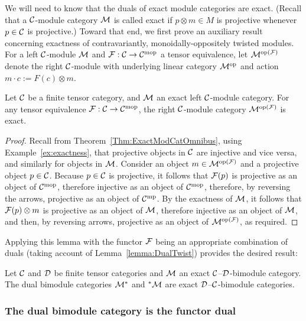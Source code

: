 \documentclass{amsart}
\begin{document}
We will need to know that the duals of exact module categories are exact.  (Recall that a $\mathcal C$-module category $\mathcal M$ is called exact if $p \otimes m \in M$ is projective whenever $p \in \mathcal C$ is projective.)  Toward that end, we first prove an auxiliary result concerning exactness of contravariantly, monoidally-oppositely twisted modules.  For a left $\mathcal C$-module $\mathcal M$ and $\mathcal F: \mathcal C \rightarrow \mathcal C^{\mathrm{mop}}$ a tensor equivalence, let $\mathcal M^{\mathrm{op}(\mathcal F)}$ denote the right $\mathcal C$-module with underlying linear category $\mathcal M^{\mathrm{op}}$ and action $m \cdot c := F(c) \otimes m$.
\begin{lemma}
Let $\mathcal C$ be a finite tensor category, and $\mathcal M$ an exact left $\mathcal C$-module category.  For any tensor equivalence $\mathcal F: \mathcal C \rightarrow \mathcal C^{\mathrm{mop}}$, the right $\mathcal C$-module category $\mathcal M^{\mathrm{op}(\mathcal F)}$ is exact.
\end{lemma}
\begin{proof}
Recall from Theorem~\ref{Thm:ExactModCatOmnibus}, using Example~\ref{ex:exactness}, that projective objects in $\mathcal C$ are injective and vice versa, and similarly for objects in $\mathcal M$.  Consider an object $m \in \mathcal M^{\mathrm{op}(\mathcal F)}$ and a projective object $p \in \mathcal C$.  Because $p \in \mathcal C$ is projective, it follows that $\mathcal F(p)$ is projective as an object of $\mathcal C^{\mathrm{mop}}$, therefore injective as an object of $\mathcal C^{\mathrm{mop}}$, therefore, by reversing the arrows, projective as an object of $\mathcal C^{\mathrm{mp}}$.  By the exactness of $\mathcal M$, it follows that $\mathcal F(p) \otimes m$ is projective as an object of $\mathcal M$, therefore injective as an object of $\mathcal M$, and then, by reversing arrows, projective as an object of $\mathcal M^{\mathrm{op}(\mathcal F)}$, as required.
\end{proof}

\noindent Applying this lemma with the functor $\mathcal F$ being an appropriate combination of duals (taking account of Lemma~\ref{lemma:DualTwist}) provides the desired result:

\begin{corollary} \label{cor:adjoint-exactness}
Let $\mathcal C$ and $\mathcal D$ be finite tensor categories and $\mathcal M$ an exact $\mathcal C$--$\mathcal D$-bimodule category.  The dual bimodule categories $\mathcal M^*$ and ${}^* \mathcal M$ are exact $\mathcal D$--$\mathcal C$-bimodule categories.
\end{corollary}

\subsubsection{The dual bimodule category is the functor dual}
\end{document}
